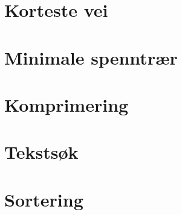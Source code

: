 \documentclass[book, 10pt, hidelinks, norsk, a4paper]{memoir}
\begin{document}
\chapter{Korteste vei}





\chapter{Minimale spenntrær}




\chapter{Komprimering}



\chapter{Tekstsøk}





\chapter{Sortering}











\appendix

\end{document}
